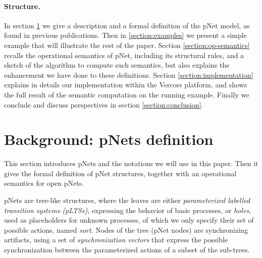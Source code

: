 \documentclass{lncs/llncs}
\newcommand{\TODO}[1]{\textcolor{red}{\textbf{[TODO:#1]}}}
\begin{document}
\paragraph{Structure.}
In section
\ref{section:pnets} we give a description and a formal definition of
the pNet model, as found in previous publications. Then in
\ref{section:examples} we present a simple example that will
illustrate the rest of the paper.
Section \ref{section:op-semantics} recalls the operational semantics
of pNet, including its structural rules, and a sketch of the algorithm
to compute such semantics, but also explains the enhancement we have
done to these definitions.
Section \ref{section:implementation} explains in details our
implementation within the Vercors platform, and shows the full result of
the semantic computation on the running example.
Finally we conclude and discuss perspectives in section
\ref{section:conclusion}. 




\section{Background: pNets definition}
\label{section:pnets}

  
This section introduces pNets and the notations we will use in
this paper. Then it gives the formal definition of pNet structures,
together with an operational semantics for open pNets.

pNets are tree-like structures, where the leaves are either
\emph{parameterized labelled transition systems (pLTSs)}, expressing the
behavior of basic processes, or \emph{holes}, used as placeholders
for unknown processes, of which we only specify their set of possible
actions, named \emph{sort}.
Nodes of the tree (pNet nodes) are synchronizing artifacts, using a
set of \emph{synchronization vectors} that express the possible
synchronization between the parameterized actions of a subset of the
sub-trees.


\end{document}
